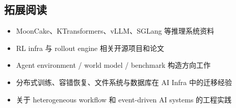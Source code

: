 \subsection{拓展阅读}
\begin{itemize}
  \item MoonCake、KTransformers、vLLM、SGLang 等推理系统资料
  \item RL infra 与 rollout engine 相关开源项目和论文
  \item Agent environment / world model / benchmark 构造方向工作
  \item 分布式训练、容错恢复、文件系统与数据库在 AI Infra 中的迁移经验
  \item 关于 heterogeneous workflow 和 event-driven AI systems 的工程实践
\end{itemize}


